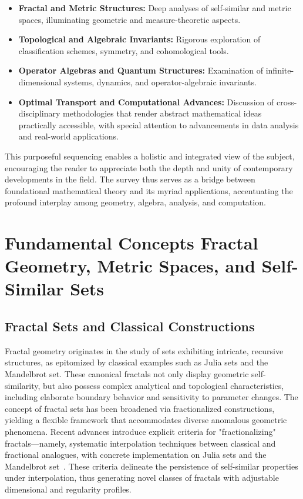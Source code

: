 \documentclass[sigconf]{acmart}
\begin{document}
\begin{itemize}
    \item \textbf{Fractal and Metric Structures:} Deep analyses of self-similar and metric spaces, illuminating geometric and measure-theoretic aspects.
    \item \textbf{Topological and Algebraic Invariants:} Rigorous exploration of classification schemes, symmetry, and cohomological tools.
    \item \textbf{Operator Algebras and Quantum Structures:} Examination of infinite-dimensional systems, dynamics, and operator-algebraic invariants.
    \item \textbf{Optimal Transport and Computational Advances:} Discussion of cross-disciplinary methodologies that render abstract mathematical ideas practically accessible, with special attention to advancements in data analysis and real-world applications.
\end{itemize}

This purposeful sequencing enables a holistic and integrated view of the subject, encouraging the reader to appreciate both the depth and unity of contemporary developments in the field. The survey thus serves as a bridge between foundational mathematical theory and its myriad applications, accentuating the profound interplay among geometry, algebra, analysis, and computation.

\section{Fundamental Concepts Fractal Geometry, Metric Spaces, and Self-Similar Sets}

\subsection{Fractal Sets and Classical Constructions}

Fractal geometry originates in the study of sets exhibiting intricate, recursive structures, as epitomized by classical examples such as Julia sets and the Mandelbrot set. These canonical fractals not only display geometric self-similarity, but also possess complex analytical and topological characteristics, including elaborate boundary behavior and sensitivity to parameter changes. The concept of fractal sets has been broadened via fractionalized constructions, yielding a flexible framework that accommodates diverse anomalous geometric phenomena. Recent advances introduce explicit criteria for "fractionalizing" fractals—namely, systematic interpolation techniques between classical and fractional analogues, with concrete implementation on Julia sets and the Mandelbrot set~\cite{ref106}. These criteria delineate the persistence of self-similar properties under interpolation, thus generating novel classes of fractals with adjustable dimensional and regularity profiles.
\end{document}
